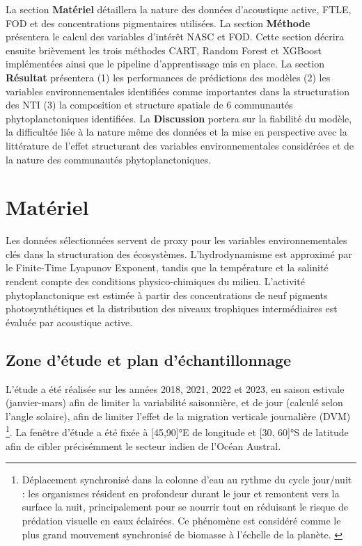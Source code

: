 \documentclass[11pt,a4paper,oneside]{report}
\begin{document}
	\vspace{0.3cm}
	
	La section \textbf{Matériel} détaillera la nature des données d'acoustique active, FTLE, FOD et des concentrations pigmentaires utilisées. La section \textbf{Méthode} présentera le calcul des variables d'intérêt NASC et FOD. Cette section décrira ensuite brièvement les trois méthodes CART, Random Forest et XGBoost implémentées ainsi que le pipeline d'apprentissage mis en place. La section \textbf{Résultat} présentera (1) les performances de prédictions des modèles (2) les variables environnementales identifiées comme importantes dans la structuration des NTI (3) la composition et structure spatiale de 6 communautés phytoplanctoniques identifiées. La \textbf{Discussion }portera sur la fiabilité du modèle, la difficultée liée à la nature même des données et la mise en perspective avec la littérature de l'effet structurant des variables environnementales considérées et de la nature des communautés phytoplanctoniques.
	
	
	
	
	
	
	
	
	
	
	
	
	
	
	\clearpage
	\chapter{Matériel}
	Les données sélectionnées servent de proxy pour les variables environnementales clés dans la structuration des écosystèmes. L'hydrodynamisme est approximé par le Finite-Time Lyapunov Exponent, tandis que la température et la salinité rendent compte des conditions physico-chimiques du milieu. L'activité phytoplanctonique est estimée à partir des concentrations de neuf pigments photosynthétiques et la distribution des niveaux trophiques intermédiaires est évaluée par acoustique active.
	
	\section{Zone d'étude et plan d'échantillonnage}
	
	L'étude a été réalisée sur les années 2018, 2021, 2022 et 2023, en saison estivale (janvier-mars) afin de limiter la variabilité saisonnière, et de jour (calculé selon l'angle solaire), afin de limiter l'effet de la migration verticale journalière (DVM) \footnote{Déplacement synchronisé dans la colonne d'eau au rythme du cycle jour/nuit : les organismes résident en profondeur durant le jour et remontent vers la surface la nuit, principalement pour se nourrir tout en réduisant le risque de prédation visuelle en eaux éclairées. Ce phénomène est considéré comme le plus grand mouvement synchronisé de biomasse à l'échelle de la planète. \cite{Bandara2021}}. La fenêtre d'étude a été fixée à [45,90]°E de longitude et [30, 60]°S de latitude afin de cibler précisémment le secteur indien de l'Océan Austral.
	
\end{document}
